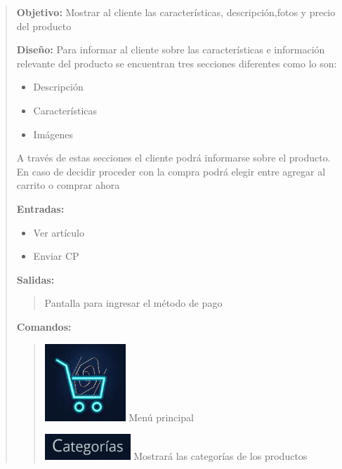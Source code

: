 \documentclass[14pt]{article}
\begin{document}
                \begin{quote}
                    \textbf{Objetivo:} Mostrar al cliente las características, descripción,fotos y precio del producto
                    
                    \textbf{Diseño:} Para informar al cliente sobre las características e información relevante del producto se encuentran tres secciones diferentes como lo son:
                        \begin{itemize}
                            \item Descripción
                            \item Características
                            \item Imágenes
                        \end{itemize}
                        A través de estas secciones el cliente podrá informarse sobre el producto. En caso de decidir proceder con la compra podrá elegir entre agregar al carrito o comprar ahora
                    
                    \textbf{Entradas:} 
                        \begin{itemize}
                            \item Ver artículo
                            \item Enviar CP
                        \end{itemize}
                    
                    \textbf{Salidas:}
                        \begin{quote}
                            Pantalla para ingresar el método de pago
                        \end{quote}
                        
                    \textbf{Comandos:}
                        \begin{quote}
                            \includegraphics[height=0.02\textwidth]{BotonMenuPrincipal.jpg}
                            \label{P5:BotonMenuPrincipal} Menú principal
                           
                            \includegraphics[height=0.02\textwidth]{BotonCategorias.jpg}
                            \label{P5:BotonCategorias} Mostrará las categorías de los productos
                           

\end{quote}
\end{quote}
\end{document}
